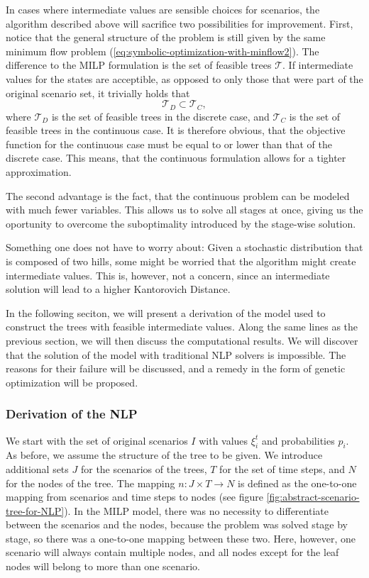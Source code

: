 \documentclass[a4paper, 12pt] {article}
\begin{document}
In cases where intermediate values are sensible choices for scenarios, the algorithm described above will sacrifice two possibilities for improvement. First, notice that the general structure of the problem is still given by the same minimum flow problem (\ref{eq:symbolic-optimization-with-minflow2}). The difference to the MILP formulation is the set of feasible trees $\mathcal{T}$. If intermediate values for the states are acceptible, as opposed to only those that were part of the original scenario set, it trivially holds that
\begin{equation}
  \label{eq:T-D-subset-T-C}
  \mathcal{T}_D\subset \mathcal{T}_C,
\end{equation}
where $\mathcal{T}_D$ is the set of feasible trees in the discrete case, and $\mathcal{T}_C$ is the set of feasible trees in the continuous case. It is therefore obvious, that the objective function for the continuous case must be equal to or lower than that of the discrete case. This means, that the continuous formulation allows for a tighter approximation.

The second advantage is the fact, that the continuous problem can be modeled with much fewer variables. This allows us to solve all stages at once, giving us the oportunity to overcome the suboptimality introduced by the stage-wise solution.

Something one does not have to worry about: Given a stochastic distribution that is composed of two hills, some might be worried that the algorithm might create intermediate values. This is, however, not a concern, since an intermediate solution will lead to a higher Kantorovich Distance.

In the following seciton, we will present a derivation of the model used to construct the trees with feasible intermediate values. Along the same lines as the previous section, we will then discuss the computational results. We will discover that the solution of the model with traditional NLP solvers is impossible. The reasons for their failure will be discussed, and a remedy in the form of genetic optimization will be proposed.
\subsubsection{Derivation of the NLP}
We start with the set of original scenarios $I$ with values $\xi_i^t$ and probabilities $p_i$. As before, we assume the structure of the tree to be given. We introduce additional sets $J$ for the scenarios of the trees, $T$ for the set of time steps, and $N$ for the nodes of the tree. The mapping $n:J\times T\rightarrow N$ is defined as the one-to-one mapping from scenarios and time steps to nodes (see figure \ref{fig:abstract-scenario-tree-for-NLP}). In the MILP model, there was no necessity to differentiate between the scenarios and the nodes, because the problem was solved stage by stage, so there was a one-to-one mapping between these two. Here, however, one scenario will always contain multiple nodes, and all nodes except for the leaf nodes will belong to more than one scenario.
\end{document}
